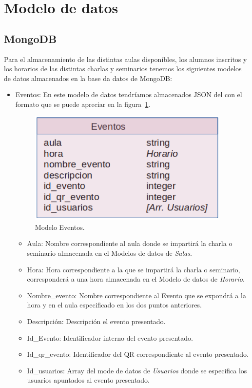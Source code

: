 \documentclass[a4paper, 12pt]{book}
\begin{document}
\clearpage

\section{Modelo de datos} 
\label{sec:modelo de datos}

\subsection{MongoDB}
	Para el almacenamiento de las distintas aulas disponibles, los alumnos inscritos y los horarios de las distintas charlas y seminarios tenemos los siguientes modelos de datos almacenados en la base da datos de MongoDB:
	
\begin{itemize}
	\item Eventos: En este modelo de datos tendríamos almacenados JSON del con el formato que se puede apreciar en la figura~\ref{fig:mongoDBEventos}.
	\begin{figure}[h!]
  	\centering
  	\includegraphics[width=10cm, keepaspectratio]{img/mongoDBEventos.png}
  	\caption{Modelo Eventos.}\label{fig:mongoDBEventos}
	\end{figure}
		\begin{itemize}
		\item Aula: Nombre correspondiente al aula donde se impartirá la charla o seminario almacenada en el Modelos de datos de \textit{Salas}.
		\item Hora: Hora correspondiente a la que se impartirá la charla o seminario, corresponderá a una hora almacenada en el Modelo de datos de \textit{Horario}.
		\item Nombre\_evento: Nombre correspondiente al Evento que se expondrá a la hora y en el aula especificado en los dos puntos anteriores.
		\item Descripción: Descripción el evento presentado.
		\item Id\_Evento: Identificador interno del evento presentado.
		\item Id\_qr\_evento: Identificador del QR correspondiente al evento presentado.
		\item Id\_usuarios: Array del mode de datos de \textit{Usuarios} donde se especifica los usuarios apuntados al evento presentado.
		\end{itemize}
		

\end{itemize}
\end{document}
